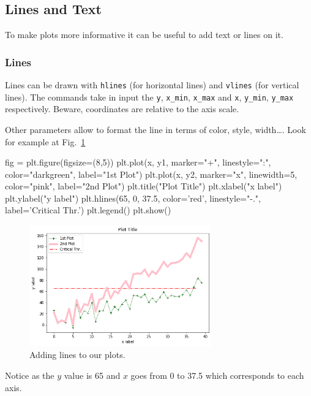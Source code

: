 \subsection{Lines and Text}\label{lines-and-text}

To make plots more informative it can be useful to add text or lines on it.

\subsubsection{Lines}\label{lines}

Lines can be drawn with \texttt{hlines} (for horizontal lines) and
\texttt{vlines} (for vertical lines). The commands take in input the \texttt{y}, \texttt{x\_min}, \texttt{x\_max} and \texttt{x}, \texttt{y\_min}, \texttt{y\_max} respectively. Beware, coordinates are relative to the axis scale.

Other parameters allow to format the line in terms of color, style, width\ldots. Look for example at Fig.~\ref{fig:lines}

\begin{ipython}
fig = plt.figure(figsize=(8,5))
plt.plot(x, y1, marker="+", linestyle=":", color="darkgreen", label="1st Plot")
plt.plot(x, y2, marker="x", linewidth=5, color="pink", label="2nd Plot")
plt.title("Plot Title")
plt.xlabel("x label")
plt.ylabel("y label")
plt.hlines(65, 0, 37.5, color='red', linestyle="-.", label='Critical Thr.')
plt.legend()
plt.show()
\end{ipython}

\begin{figure}[htb]
	\centering
	\includegraphics[width=0.7\textwidth]{figures/lines}
	\caption{Adding lines to our plots.}
	\label{fig:lines}
\end{figure}

Notice as the $y$ value is 65 and $x$ goes from 0 to 37.5 which corresponds to each axis.

